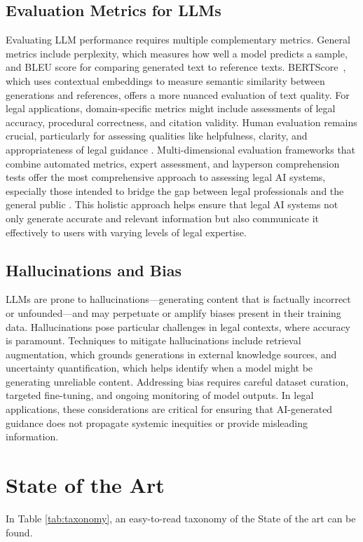 \subsection{Evaluation Metrics for LLMs}
Evaluating LLM performance requires multiple complementary metrics. General metrics 
include perplexity, which measures how well a model predicts a sample, 
and BLEU score for comparing generated text to reference texts. 
BERTScore~\cite{zhang2020bertscoreevaluatingtextgeneration}, which uses contextual 
embeddings to measure semantic similarity between generations and references, 
offers a more nuanced evaluation of text quality. For legal applications, 
domain-specific metrics might include assessments of legal accuracy, 
procedural correctness, and citation validity. Human evaluation remains crucial, 
particularly for assessing qualities like helpfulness, clarity, and appropriateness 
of legal guidance \cite{guha2023legalbench, li2024experimentinglegalaisolutions}. 
Multi-dimensional evaluation frameworks that combine automated metrics, expert assessment, 
and layperson comprehension tests offer the most comprehensive approach to assessing legal AI systems, 
especially those intended to bridge the gap between legal professionals and the general public \cite{guo2023evaluating}. 
This holistic approach helps ensure that legal AI systems not only generate accurate and relevant 
information but also communicate it effectively to users with varying levels of legal expertise.
\subsection{Hallucinations and Bias}
LLMs are prone to hallucinations—generating content that is factually incorrect 
or unfounded—and may perpetuate or amplify biases present in their training data. 
Hallucinations pose particular challenges in legal contexts, where accuracy is 
paramount. Techniques to mitigate hallucinations include retrieval augmentation, 
which grounds generations in external knowledge sources, and uncertainty 
quantification, which helps identify when a model might be generating unreliable 
content. Addressing bias requires careful dataset curation, targeted fine-tuning, 
and ongoing monitoring of model outputs. In legal applications, these considerations 
are critical for ensuring that AI-generated guidance does not propagate systemic 
inequities or provide misleading information. 


\section{State of the Art}
In Table \ref{tab:taxonomy}, an easy-to-read taxonomy of the State of the art can be found.

